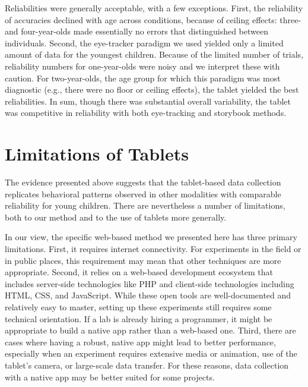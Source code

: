 \documentclass[man,noapacite]{apa2}
\begin{document}
Reliabilities were generally acceptable, with a few exceptions. First, the reliability of accuracies declined with age across conditions, because of ceiling effects: three- and four-year-olds made essentially no errors that distinguished between individuals. Second, the eye-tracker paradigm we used yielded only a limited amount of data for the youngest children. Because of the limited number of trials, reliability numbers for one-year-olds were noisy and we interpret these with caution. For two-year-olds, the age group for which this paradigm was most diagnostic (e.g., there were no floor or ceiling effects), the tablet yielded the best reliabilities. In sum, though there was substantial overall variability, the tablet was competitive in reliability with both eye-tracking and storybook methods. 

\section{Limitations of Tablets}


The evidence presented above suggests that the tablet-based data collection replicates behavioral patterns observed in other modalities with comparable reliability for young children. There are nevertheless a number of limitations, both to our method and to the use of tablets more generally. 


In our view, the specific web-based method we presented here has three primary limitations. First, it requires internet connectivity. For experiments in the field or in public places, this requirement may mean that other techniques are more appropriate. Second, it relies on a web-based development ecosystem that includes server-side technologies like PHP and client-side technologies including HTML, CSS, and JavaScript. While these open tools are well-documented and relatively easy to master, setting up these experiments still requires some technical orientation. If a lab is already hiring a programmer, it might be appropriate to build a native app rather than a web-based one. Third, there are cases where having a robust, native app might lead to better performance, especially when an experiment requires extensive media or animation, use of the tablet's camera, or large-scale data transfer.  For these reasons, data collection with a native app may be better suited for some projects.
\end{document}
